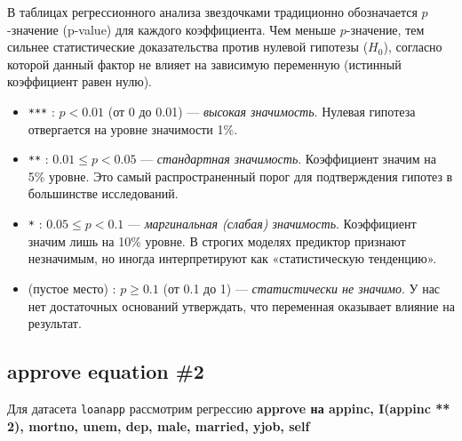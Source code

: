 \documentclass[
  russian,
]{article}
\providecommand{\tightlist}{%
  \setlength{\itemsep}{0pt}\setlength{\parskip}{0pt}}
\begin{document}
\begin{tcolorbox}[enhanced jigsaw, arc=.35mm, bottomrule=.15mm, bottomtitle=1mm, breakable, colback=white, colbacktitle=quarto-callout-note-color!10!white, colframe=quarto-callout-note-color-frame, coltitle=black, left=2mm, leftrule=.75mm, opacityback=0, opacitybacktitle=0.6, rightrule=.15mm, title=\textcolor{quarto-callout-note-color}{\faInfo}\hspace{0.5em}{Расшифровка кодов статистической значимости (Signif. codes)}, titlerule=0mm, toprule=.15mm, toptitle=1mm]

В таблицах регрессионного анализа звездочками традиционно обозначается
\(p\)-значение (p-value) для каждого коэффициента. Чем меньше
\(p\)-значение, тем сильнее статистические доказательства против нулевой
гипотезы (\(H_0\)), согласно которой данный фактор не влияет на
зависимую переменную (истинный коэффициент равен нулю).

\begin{itemize}
\tightlist
\item
  \texttt{***} : \textbf{\(p < 0.01\)} (от 0 до 0.01) --- \emph{высокая
  значимость}. Нулевая гипотеза отвергается на уровне значимости 1\%.
\item
  \texttt{**} : \textbf{\(0.01 \le p < 0.05\)} --- \emph{стандартная
  значимость}. Коэффициент значим на 5\% уровне. Это самый
  распространенный порог для подтверждения гипотез в большинстве
  исследований.
\item
  \texttt{*} : \textbf{\(0.05 \le p < 0.1\)} --- \emph{маргинальная
  (слабая) значимость}. Коэффициент значим лишь на 10\% уровне. В
  строгих моделях предиктор признают незначимым, но иногда
  интерпретируют как «статистическую тенденцию».
\item
  \texttt{} (пустое место) : \textbf{\(p \ge 0.1\)} (от 0.1 до 1) ---
  \emph{статистически не значимо}. У нас нет достаточных оснований
  утверждать, что переменная оказывает влияние на результат.
\end{itemize}

\end{tcolorbox}

\subsection{approve equation \#2}\label{approve-equation-2-1}

Для датасета \texttt{loanapp} рассмотрим регрессию \textbf{approve на
appinc, I(appinc ** 2), mortno, unem, dep, male, married, yjob, self}
\end{document}
